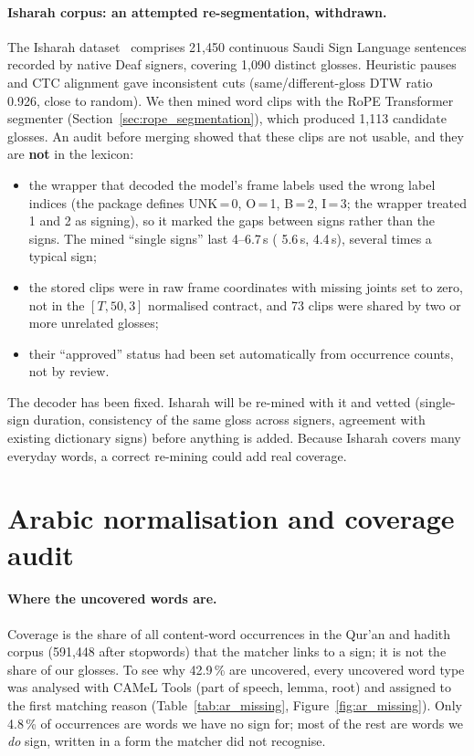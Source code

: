\paragraph{Isharah corpus: an attempted re-segmentation, withdrawn.}
The Isharah dataset~\cite{isharah} comprises 21,450 continuous Saudi Sign Language sentences recorded by native Deaf
signers, covering 1,090 distinct glosses. Heuristic pauses and CTC alignment gave inconsistent cuts (same/different-gloss
DTW ratio 0.926, close to random). We then mined word clips with the RoPE Transformer segmenter
(Section~\ref{sec:rope_segmentation}), which produced 1,113 candidate glosses. An audit before merging showed that these clips
are not usable, and they are \textbf{not} in the lexicon:
\begin{itemize}[leftmargin=*,itemsep=2pt]
  \item the wrapper that decoded the model's frame labels used the wrong label indices (the package defines UNK\,=\,0,
    O\,=\,1, B\,=\,2, I\,=\,3; the wrapper treated 1 and 2 as signing), so it marked the gaps between signs rather than the
    signs. The mined ``single signs'' last 4--6.7\,s ( 5.6\,s,  4.4\,s), several times a typical sign;
  \item the stored clips were in raw frame coordinates with missing joints set to zero, not in the $[T,50,3]$
    normalised contract, and 73 clips were shared by two or more unrelated glosses;
  \item their ``approved'' status had been set automatically from occurrence counts, not by review.
\end{itemize}
The decoder has been fixed. Isharah will be re-mined with it and vetted (single-sign duration, consistency of the same
gloss across signers, agreement with existing dictionary signs) before anything is added. Because Isharah covers
many everyday words, a correct re-mining could add real coverage.

\section{Arabic normalisation and coverage audit}
\label{sec:ar_norm}

\paragraph{Where the uncovered words are.} Coverage is the share of all content-word occurrences in the Qur'an and hadith
corpus (591,448 after stopwords) that the matcher links to a sign; it is not the share of our glosses. To see why 42.9\,\% are
uncovered, every uncovered word type was analysed with CAMeL Tools (part of speech, lemma, root) and assigned to the first
matching reason (Table~\ref{tab:ar_missing}, Figure~\ref{fig:ar_missing}). Only 4.8\,\% of occurrences are words we have no
sign for; most of the rest are words we \emph{do} sign, written in a form the matcher did not recognise.

